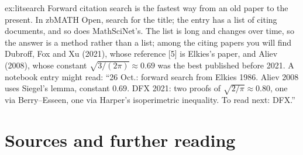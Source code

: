 \begin{solution}{ex:litsearch}
\idea Forward citation search is the fastest way from an old paper to the present.
\writeup In zbMATH Open, search for the title; the entry has a list of citing documents, and so does MathSciNet's. The list is long and changes over
time, so the answer is a method rather than a list; among the citing papers you will find Dubroff, Fox and Xu (2021), whose reference [5] is Elkies's
paper, and Aliev (2008), whose constant $\sqrt{3/(2\pi)}\approx0.69$ was the best published before 2021. A notebook entry might read: ``26 Oct.: forward search from
Elkies 1986. Aliev 2008 uses Siegel's lemma, constant $0.69$. DFX 2021: two proofs of $\sqrt{2/\pi}\approx0.80$, one via Berry--Esseen, one via Harper's
isoperimetric inequality. To read next: DFX.''
\end{solution}

\section*{Sources and further reading}

